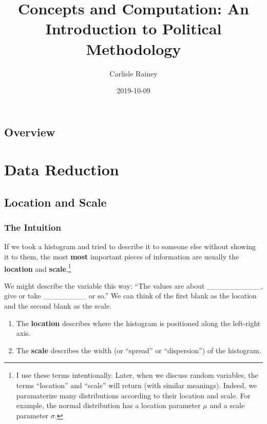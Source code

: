\documentclass[]{book}
\title{Concepts and Computation: An Introduction to Political Methodology}
\author{Carlisle Rainey}
\date{2019-10-09}
\providecommand{\tightlist}{%
  \setlength{\itemsep}{0pt}\setlength{\parskip}{0pt}}
\let\rmarkdownfootnote\footnote%
\def\footnote{\protect\rmarkdownfootnote}
\begin{document}
\maketitle

{
\setcounter{tocdepth}{1}
\tableofcontents
}
\hypertarget{overview}{%
\chapter{Overview}\label{overview}}

\hypertarget{part-data-reduction}{%
\part{Data Reduction}\label{part-data-reduction}}

\hypertarget{location-and-scale}{%
\chapter{Location and Scale}\label{location-and-scale}}

\hypertarget{the-intuition}{%
\section{The Intuition}\label{the-intuition}}

If we took a histogram and tried to describe it to someone else without showing it to them, the most \textbf{most} important pieces of information are usually the \textbf{location} and \textbf{scale}.\footnote{I use these terms intentionally. Later, when we discuss random variables, the terms ``location'' and ``scale'' will return (with similar meanings). Indeed, we paramaterize many distributions according to their location and scale. For example, the normal distribution has a location parameter \(\mu\) and a scale parameter \(\sigma\).}

We might describe the variable this way: ``The values are about \_\_\_\_\_\_\_\_\_\_, give or take \_\_\_\_\_\_\_\_ or so.'' We can think of the first blank as the location and the second blank as the scale.

\begin{enumerate}
\def\labelenumi{\arabic{enumi}.}
\tightlist
\item
  The \textbf{location} describes where the histogram is positioned along the left-right axis.
\item
  The \textbf{scale} describes the width (or ``spread'' or ``dispersion'') of the histogram.
\end{enumerate}
\end{document}
